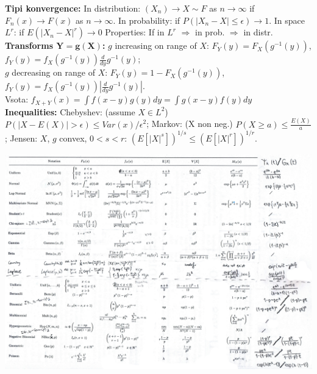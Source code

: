 \documentclass[a4paper, oneside, 12pt]{article}
\theoremstyle{definition}
\begin{document}
\textbf{Tipi konvergence:}
In distribution: $(X_n) \to X \sim F$ as $n \to \infty$ if $F_n(x) \to F(x)$ as $n \to \infty$. In probability: if $P(|X_n - X| \leq \epsilon) \to 1$. In space $L^r$: if $E(|X_n -X|^r) \to 0$ Properties: If in $L^r$ $\Rightarrow$ in prob. $\Rightarrow$ in distr.\\
\textbf{Transforms $\boldsymbol{Y=g(X)}$:} $g$ increasing on range of $X$: $F_Y(y)=F_X(g^{-1}(y))$,
$f_Y(y)=f_X(g^{-1}(y))\frac{d}{dy}g^{-1}(y)$;\\
$g$ decreasing on range of $X$: $F_Y(y)=1-F_X(g^{-1}(y))$, $f_Y(y)=f_X(g^{-1}(y))|\frac{d}{dy}g^{-1}(y)|$.\\
Vsota: $f_{X + Y} (x) = \int f(x-y) g(y) dy = \int g(x-y) f(y) dy$\\
\textbf{Inequalities:}
Chebyshev: (assume $X \in L^2$) $P(|X -E(X)| > \epsilon) \leq Var(x)/ \epsilon^2 $;
Markov: (X non neg.) $P(X\geq a) \leq \frac{E(X)}{a}$; Jensen: $X$, $g$ convex, $0<s<r$: $(E[|X|^s])^{1/s} \leq (E[|X|^r])^{1/r}$.

\includegraphics[angle=90,origin=c,width=1\textwidth]{tabela_spremenljivk.png}
\end{document}

